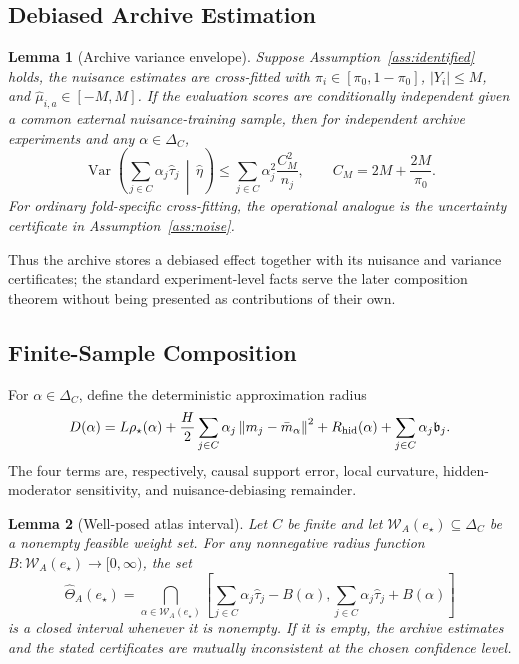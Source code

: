 \documentclass[11pt]{article}
\numberwithin{equation}{section}
\newtheorem{lemma}{Lemma}[section]
\DeclareMathOperator{\Var}{Var}
\newcommand{\1}{\mathbf 1}
\newcommand{\cW}{\mathcal W}
\newcommand{\norm}[1]{\left\lVert #1\right\rVert}
\newcommand{\abs}[1]{\left\lvert #1\right\rvert}
\begin{document}
\subsection{Debiased Archive Estimation}

\begin{lemma}[Archive variance envelope]
\label{lem:variance-envelope}
Suppose Assumption~\ref{ass:identified} holds, the nuisance estimates are
cross-fitted with \(\widehat\pi_i\in[\pi_0,1-\pi_0]\),
\(\abs{Y_i}\le M\), and \(\widehat\mu_{i,a}\in[-M,M]\).  If the evaluation
scores are conditionally independent given a common external nuisance-training
sample, then for independent archive experiments and any \(\alpha\in\Delta_C\),
\[
  \Var\left(
    \sum_{j\in C}\alpha_j\widehat\tau_j
    \,\middle|\,
    \widehat\eta
  \right)
  \le
  \sum_{j\in C}\alpha_j^2\frac{C_M^2}{n_j},
  \qquad
  C_M=2M+\frac{2M}{\pi_0}.
\]
For ordinary fold-specific cross-fitting, the operational analogue is the
uncertainty certificate in Assumption~\ref{ass:noise}.
\end{lemma}

Thus the archive stores a debiased effect together with its nuisance and
variance certificates; the standard experiment-level facts serve the later
composition theorem without being presented as contributions of their own.

\subsection{Finite-Sample Composition}

For \(\alpha\in\Delta_C\), define the deterministic approximation radius
\begin{equation}
\label{eq:det-radius}
  D(\alpha)
  =
  L\rho_\star(\alpha)
  +\frac{H}{2}\sum_{j\in C}\alpha_j\norm{m_j-\bar m_\alpha}^2
  +R_{\rm hid}(\alpha)
  +\sum_{j\in C}\alpha_j\mathfrak b_j.
\end{equation}
The four terms are, respectively, causal support error, local curvature, hidden-moderator sensitivity, and nuisance-debiasing remainder.

\begin{lemma}[Well-posed atlas interval]
\label{lem:wellposed}
Let \(C\) be finite and let \(\cW_A(e_\star)\subseteq\Delta_C\) be a nonempty feasible weight set.  For any nonnegative radius function \(B:\cW_A(e_\star)\to[0,\infty)\), the set
\[
  \widehat\Theta_A(e_\star)
  =
  \bigcap_{\alpha\in\cW_A(e_\star)}
  \left[
  \sum_{j\in C}\alpha_j\widehat\tau_j-B(\alpha),
  \sum_{j\in C}\alpha_j\widehat\tau_j+B(\alpha)
  \right]
\]
is a closed interval whenever it is nonempty.  If it is empty, the archive estimates and the stated certificates are mutually inconsistent at the chosen confidence level.
\end{lemma}
\end{document}
